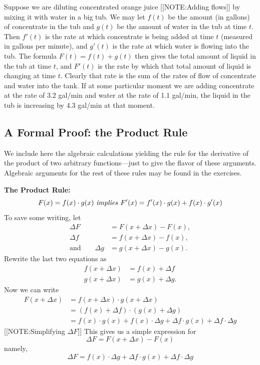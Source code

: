 Suppose we are diluting concentrated orange juice 
[[NOTE:Adding flows]] 
by mixing it with water in a big tub.  We may let $f(t)$ be the amount
(in gallons) of concentrate in the tub and $g(t)$ be the amount of
water in the tub at time $t$.  Then $f'(t)$ is the rate at which
concentrate is being added at time $t$ (measured in gallons per
minute), and $g'(t)$ is the rate at which water is flowing into the
tub.  The formula $F(t) = f(t) + g(t)$ then gives the total amount of
liquid in the tub at time $t$, and $F'(t)$ is the rate by which that
total amount of liquid is changing at time $t$.  Clearly that rate is
the sum of the rates of flow of concentrate and water into the tank.
If at some particular moment we are adding concentrate at the rate of
3.2 gal/min and water at the rate of 1.1 gal/min, the liquid in the
tub is increasing by 4.3 gal/min at that moment.


\subsection{A Formal Proof: the Product Rule}
\label{subsec:a-formal-proof-the-product-rule}

We include here the algebraic calculations yielding the rule for the
derivative of the product of two arbitrary functions---just to give
the flavor of these arguments.  Algebraic arguments for the rest of
these rules may be found in the exercises.





{\bf The Product Rule:}
\[
F(x) = f(x) \cdot g(x) \mbox{ \em implies\/}\ F'(x) = f'(x)\cdot g(x) + f(x)\cdot g'(x)
\]
To save some writing,  let
\begin{align*}
\Delta F &= F(x + \Delta x) - F(x), \\
\Delta f &= f(x + \Delta x) - f(x),   \\
\mbox{and} \qquad \Delta g &= g(x + \Delta x) - g(x).
\end{align*}
Rewrite the last two equations as
\begin{align*}
f(x + \Delta x) &= f(x) + \Delta f  \\
g(x + \Delta x) &= g(x) + \Delta g.
\end{align*}
Now we can write
\begin{align*}
F(x + \Delta x) &= f(x + \Delta x)\cdot g(x + \Delta x)  \\
                &= (f(x) + \Delta f) \cdot (g(x) + \Delta g)  \\
       &= f(x) \cdot g(x) + f(x) \cdot \Delta g + \Delta f \cdot g(x) 
                + \Delta f \cdot \Delta g
\end{align*}
	[[NOTE:Simplifying $\Delta F$]]
This gives us a simple expression for
\[
\Delta F = F(x + \Delta x) - F(x)
\]
namely,
\[
\Delta F = f(x) \cdot \Delta g + \Delta f\cdot g(x) + \Delta f\cdot \Delta g
\]




